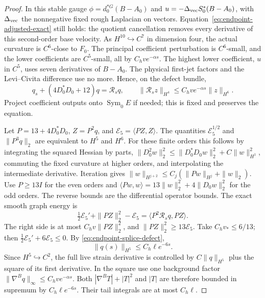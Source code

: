 \documentclass[11pt]{article}
\numberwithin{equation}{section}
\theoremstyle{definition}
\theoremstyle{remark}
\begin{document}
\begin{proof}
In this stable gauge
\(\phi=d_0^{*G}(B-A_0)\) and
\(u=-\Delta_{\rm vec}S_0^*(B-A_0)\), with
\(\Delta_{\rm vec}\) the nonnegative fixed rough
Laplacian on vectors. Equation~\eqref{eq:endpoint-adjusted-exact}
still holds: the quotient cancellation removes every
derivative of this second-order base velocity.
As \(H^{10}\hookrightarrow C^7\) in dimension four,
the actual curvature is \(C^6\)-close to \(F_0\).
The principal coefficient perturbation is \(C^6\)-small,
and the lower coefficients are \(C^5\)-small, all by
\(C_hv e^{-\alpha s}\). The highest lower coefficient,
\(u\) in \(C^5\), uses seven derivatives of \(B-A_0\).
The physical first-jet factors and the Levi--Civita
difference use no more. Hence, on the defect bundle,
\[
 q_s+(4D_0^*D_0+12)q=\mathcal R_s q,\qquad
 \|\mathcal R_sz\|_{H^4}\le C_hv e^{-\alpha s}\|z\|_{H^6}.
\]
Project coefficient outputs onto \(\operatorname{Sym}_0E\)
if needed; this is fixed and preserves the equation.

Let \(P=13+4D_0^*D_0\), \(Z=P^2q\), and
\(\mathscr E_5=\langle PZ,Z\rangle\).
The quantities \(\mathscr E_5^{1/2}\) and \(\|P^3q\|_2\)
are equivalent to \(H^5\) and \(H^6\).
For these finite orders this follows by integrating
the squared Hessian by parts,
\(\|D_0^2w\|_2^2\le\|D_0^*D_0w\|_2^2+
C\|w\|_{H^1}^2\), commuting the fixed curvature at
higher orders, and interpolating the intermediate
derivative. Iteration gives
\(\|w\|_{H^{j+2}}\le C_j(\|Pw\|_{H^j}+\|w\|_2)\).
Use \(P\ge13I\) for the even orders and
\(\langle Pw,w\rangle=13\|w\|_2^2+4\|D_0w\|_2^2\)
for the odd orders. The reverse bounds are the
differential operator bounds.
The exact smooth graph energy is
\[
 \tfrac12\mathscr E_5'+\|PZ\|_2^2-\mathscr E_5
       =\langle P^2\mathcal R_sq,PZ\rangle .
\]
The right side is at most \(C_hv\|PZ\|_2^2\),
and \(\|PZ\|_2^2\ge13\mathscr E_5\).
Take \(C_hv_*\le6/13\); then
\(\tfrac12\mathscr E_5'+6\mathscr E_5\le0\).
By \eqref{eq:endpoint-splice-defect},
\[
                         \|q(s)\|_{H^5}\le C_h\ell e^{-6s}.
\]
Since \(H^5\hookrightarrow C^2\), the full live
strain derivative is controlled by \(C\|q\|_{H^5}\)
plus the square of its first derivative.
In the square use one background factor
\(\|\nabla^Bq\|_\infty\le C_hv e^{-\alpha s}\).
Both \(|\nabla^BT|+|T|^2\) and \(|T|\) are
therefore bounded in supremum by \(C_h\ell e^{-6s}\).
Their tail integrals are at most \(C_h\ell\).


\end{proof}
\end{document}
